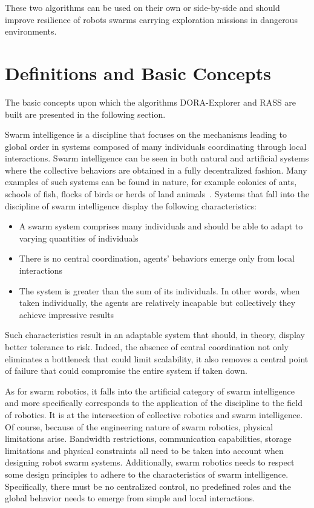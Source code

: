 These two algorithms can be used on their own or side-by-side and should improve resilience of robots swarms carrying exploration missions in dangerous environments.


\section{Definitions and Basic Concepts}
The basic concepts upon which the algorithms DORA-Explorer and RASS are built are presented in the following section.

Swarm intelligence is a discipline that focuses on the mechanisms leading to global order in systems composed of many individuals coordinating through local interactions. Swarm intelligence can be seen in both natural and artificial systems where the collective behaviors are obtained in a fully decentralized fashion. Many examples of such systems can be found in nature, for example colonies of ants, schools of fish, flocks of birds or herds of land animals~\cite{Dorigo:2007}. Systems that fall into the discipline of swarm intelligence display the following characteristics: 

\begin{itemize}
    \item A swarm system comprises many individuals and should be able to adapt to varying quantities of individuals
    \item There is no central coordination, agents' behaviors emerge only from local interactions
    \item The system is greater than the sum of its individuals. In other words, when taken individually, the agents are relatively incapable but collectively they achieve impressive results
\end{itemize}

Such characteristics result in an adaptable system that should, in theory, display better tolerance to risk. Indeed, the absence of central coordination not only eliminates a bottleneck that could limit scalability, it also removes a central point of failure that could compromise the entire system if taken down.

As for swarm robotics, it falls into the artificial category of swarm intelligence and more specifically corresponds to the application of the discipline to the field of robotics. It is at the intersection of collective robotics and swarm intelligence. Of course, because of the engineering nature of swarm robotics, physical limitations arise. Bandwidth restrictions, communication capabilities, storage limitations and physical constraints all need to be taken into account when designing robot swarm systems. Additionally, swarm robotics needs to respect some design principles to adhere to the characteristics of swarm intelligence. Specifically, there must be no centralized control, no predefined roles and the global behavior needs to emerge from simple and local interactions.

